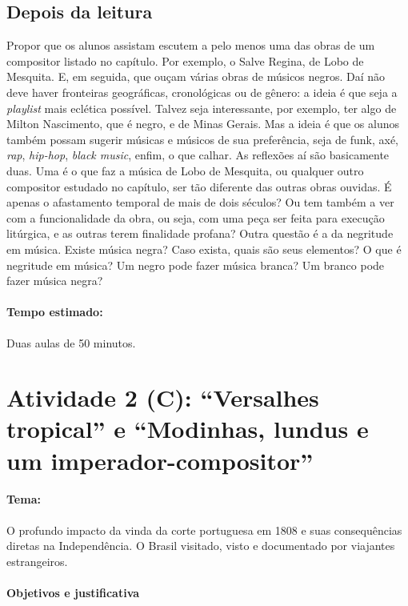 \documentclass[11pt]{extarticle}
\begin{document}
\subsection{Depois da leitura}

Propor que os alunos assistam escutem a pelo menos uma das obras de um
compositor listado no capítulo. Por exemplo, o Salve Regina, de Lobo de
Mesquita. E, em seguida, que ouçam várias obras de músicos negros. Daí não deve
haver fronteiras geográficas, cronológicas ou de gênero: a ideia é que seja a
\textit{playlist} mais eclética possível. Talvez seja interessante, por exemplo, ter
algo de Milton Nascimento, que é negro, e de Minas Gerais. Mas a ideia é que os
alunos também possam sugerir músicas e músicos de sua preferência, seja de
funk, axé, \textit{rap}, \textit{hip-hop}, \textit{black music}, enfim, o que calhar. As reflexões aí são
basicamente duas. Uma é o que faz a música de Lobo de Mesquita, ou qualquer
outro compositor estudado no capítulo, ser tão diferente das outras obras
ouvidas. É apenas o afastamento temporal de mais de dois séculos? Ou tem também
a ver com a funcionalidade da obra, ou seja, com uma peça ser feita para
execução litúrgica, e as outras terem finalidade profana? Outra questão é a da
negritude em música. Existe música negra? Caso exista, quais são seus
elementos? O que é negritude em música? Um negro pode fazer música branca? Um
branco pode fazer música negra?

\paragraph{Tempo estimado:} Duas aulas de 50 minutos. 

\section{Atividade 2 (C): “Versalhes tropical” e “Modinhas, lundus e um
imperador-compositor”}

\paragraph{Tema:} O profundo impacto da vinda da corte portuguesa em 1808 e suas
consequências diretas na Independência. O Brasil visitado, visto e documentado
por viajantes estrangeiros. 

 

\paragraph{Objetivos e justificativa}
\end{document}
